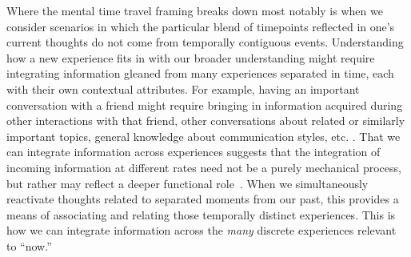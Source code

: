 \documentclass{article}
\begin{document}
Where the mental time travel framing breaks down most notably is when we consider scenarios in which the particular blend of timepoints reflected in one's current thoughts do not come from temporally contiguous events.  Understanding how a new experience fits in with our broader understanding might require integrating information gleaned from many experiences separated in time, each with their own contextual attributes.  For example, having an important conversation with a friend might require bringing in information acquired during other interactions with that friend, other conversations about related or similarly important topics, general knowledge about communication styles, etc.  \citep[This notion of bringing a range of prior experiences to bear on guiding our ongoing behaviors is also related to a literature on \textit{situtation models}; for review see][]{RangRitc12}.  That we can integrate information across experiences suggests that the integration of incoming information at different rates need not be a purely mechanical process, but rather may reflect a deeper functional role~\citep[also see][]{BrigEtal18}.  When we simultaneously reactivate thoughts related to separated moments from our past, this provides a means of associating and relating those temporally distinct experiences.  This is how we can integrate information across the \textit{many} discrete experiences relevant to ``now.''
\end{document}
